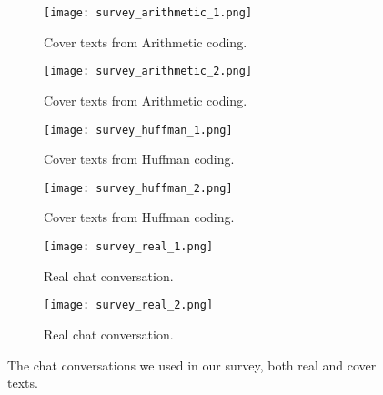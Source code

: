 \begin{figure}
	\begin{wide}
		\captionsetup{width=\linewidth}

		\begin{subfigure}{0.3\linewidth}
            \centering
			\texttt{[image: survey\_arithmetic\_1.png]}
			\caption{Cover texts from Arithmetic coding.}
			\label{fig:surveyArithmetic1}
		\end{subfigure}
        \hfill
		\begin{subfigure}{0.3\linewidth}
			\centering
			\texttt{[image: survey\_arithmetic\_2.png]}
			\caption{Cover texts from Arithmetic coding.}
			\label{fig:surveyArithmetic2}
		\end{subfigure}
		\hfill
		\begin{subfigure}{0.3\linewidth}
            \centering
			\texttt{[image: survey\_huffman\_1.png]}
			\caption{Cover texts from Huffman coding.}
			\label{fig:surveyHuffman1}
		\end{subfigure}

		\begin{subfigure}{0.3\linewidth}
			\centering
			\texttt{[image: survey\_huffman\_2.png]}
			\caption{Cover texts from Huffman coding.}
			\label{fig:surveyHuffman2}
		\end{subfigure}
		\hfill
		\begin{subfigure}{0.3\linewidth}
            \centering
			\texttt{[image: survey\_real\_1.png]}
			\caption{Real chat conversation.}
			\label{fig:surveyReal1}
		\end{subfigure}
        \hfill
		\begin{subfigure}{0.3\linewidth}
			\centering
			\texttt{[image: survey\_real\_2.png]}
			\caption{Real chat conversation.}
			\label{fig:surveyReal2}
		\end{subfigure}

		\caption[Survey: Chats]{The chat conversations we used in our survey, both real and cover texts.}
		\label{fig:survey}
	\end{wide}
\end{figure}

